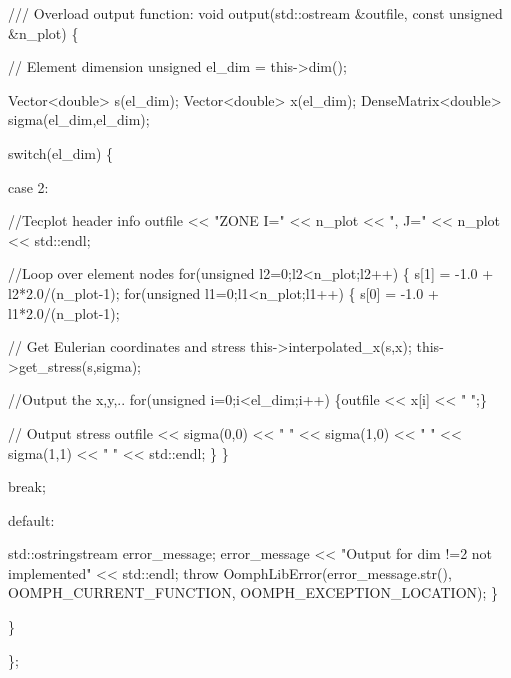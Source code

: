 \begin{DoxyCodeInclude}
\textcolor{comment}{}
\textcolor{comment}{ /// Overload output function:}
\textcolor{comment}{} \textcolor{keywordtype}{void} output(std::ostream &outfile, \textcolor{keyword}{const} \textcolor{keywordtype}{unsigned} &n\_plot)
  \{

   \textcolor{comment}{// Element dimension}
   \textcolor{keywordtype}{unsigned} el\_dim = this->dim();

   Vector<double> s(el\_dim);
   Vector<double> x(el\_dim);
   DenseMatrix<double> sigma(el\_dim,el\_dim);
   
   \textcolor{keywordflow}{switch}(el\_dim)
    \{
     
    \textcolor{keywordflow}{case} 2:

     \textcolor{comment}{//Tecplot header info }
     outfile << \textcolor{stringliteral}{"ZONE I="} << n\_plot << \textcolor{stringliteral}{", J="} << n\_plot << std::endl;
     
     \textcolor{comment}{//Loop over element nodes}
     \textcolor{keywordflow}{for}(\textcolor{keywordtype}{unsigned} l2=0;l2<n\_plot;l2++)
      \{
       s[1] = -1.0 + l2*2.0/(n\_plot-1);
       \textcolor{keywordflow}{for}(\textcolor{keywordtype}{unsigned} l1=0;l1<n\_plot;l1++)
        \{
         s[0] = -1.0 + l1*2.0/(n\_plot-1);
         
         \textcolor{comment}{// Get Eulerian coordinates and stress}
         this->interpolated\_x(s,x);
         this->get\_stress(s,sigma);

         \textcolor{comment}{//Output the x,y,..}
         \textcolor{keywordflow}{for}(\textcolor{keywordtype}{unsigned} i=0;i<el\_dim;i++) 
          \{outfile << x[i] << \textcolor{stringliteral}{" "};\}

         \textcolor{comment}{// Output stress}
         outfile << sigma(0,0) << \textcolor{stringliteral}{" "}
                 << sigma(1,0) << \textcolor{stringliteral}{" "}
                 << sigma(1,1) << \textcolor{stringliteral}{" "}
                 << std::endl;
        \}
      \}

     \textcolor{keywordflow}{break};
     
    \textcolor{keywordflow}{default}:

     std::ostringstream error\_message;
     error\_message << \textcolor{stringliteral}{"Output for dim !=2 not implemented"} << std::endl;
     \textcolor{keywordflow}{throw} OomphLibError(error\_message.str(),
                         OOMPH\_CURRENT\_FUNCTION,
                         OOMPH\_EXCEPTION\_LOCATION);
    \}
  
  \}

\};

\end{DoxyCodeInclude}


